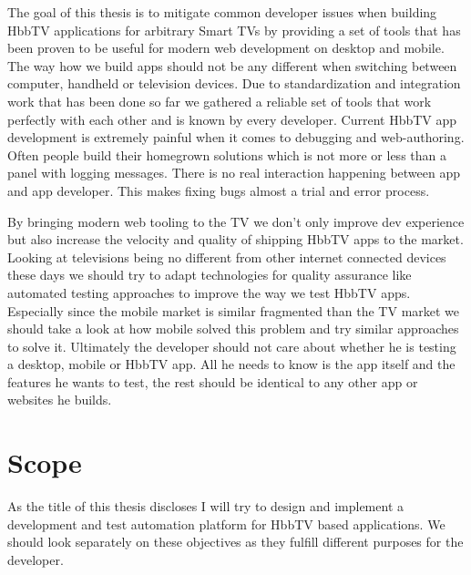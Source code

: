 The goal of this thesis is to mitigate common developer issues when building HbbTV applications for arbitrary
Smart TVs by providing a set of tools that has been proven to be useful for modern web development on desktop
and mobile. The way how we build apps should not be any different when switching between computer, handheld or
television devices. Due to standardization and integration work that has been done so far we gathered a reliable
set of tools that work perfectly with each other and is known by every developer. Current HbbTV app development
is extremely painful when it comes to debugging and web-authoring. Often people build their homegrown solutions
which is not more or less than a panel with logging messages. There is no real interaction happening between app
and app developer. This makes fixing bugs almost a trial and error process.

By bringing modern web tooling to the TV we don't only improve dev experience but also increase the velocity
and quality of shipping HbbTV apps to the market. Looking at televisions being no different from other internet
connected devices these days we should try to adapt technologies for quality assurance like automated testing
approaches to improve the way we test HbbTV apps. Especially since the mobile market is similar fragmented
than the TV market we should take a look at how mobile solved this problem and try similar approaches to solve
it. Ultimately the developer should not care about whether he is testing a desktop, mobile or HbbTV app. All
he needs to know is the app itself and the features he wants to test, the rest should be identical to any other
app or websites he builds.

\section{Scope\label{sec:scope}}

As the title of this thesis discloses I will try to design and implement a development and test automation
platform for HbbTV based applications. We should look separately on these objectives as they fulfill different
purposes for the developer.

